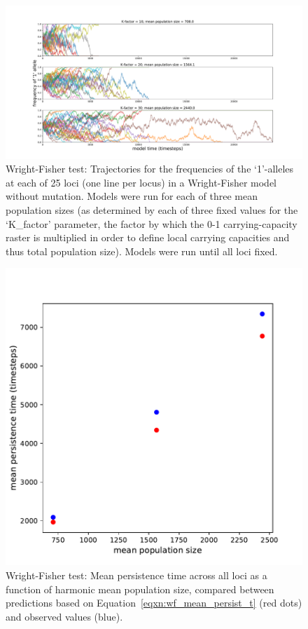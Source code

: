 ﻿\documentclass{article}
\begin{document}
\begin{figure}[ht!]
\includegraphics[width=175mm]{./img/final/WF_allele_trajectories.pdf}
        \caption{Wright-Fisher test: Trajectories for the frequencies of
                 the `1'-alleles at each of 25 loci (one line per locus)
                 in a Wright-Fisher model without mutation.
                 Models were run for each of three mean population sizes
                 (as determined by each of three fixed values for the
                 `K\_factor' parameter, the factor by which the 0-1
                 carrying-capacity raster is multiplied in order to
                 define local carrying capacities and thus total population
                 size).
                 Models were run until all loci fixed.}
        \label{fig:wf_trajs}
\end{figure}


\begin{figure}[ht!]
\includegraphics[width=150mm]{./img/final/WF_mean_persist_vs_pop_size.pdf}
        \caption{Wright-Fisher test: Mean persistence time across all loci
                 as a function of harmonic mean population size,
                 compared between predictions based on
                 Equation~\ref{eqxn:wf_mean_persist_t} (red dots)
                 and observed values (blue).}
        \label{fig:wf_persist_vs_popsize}
\end{figure}
\end{document}
